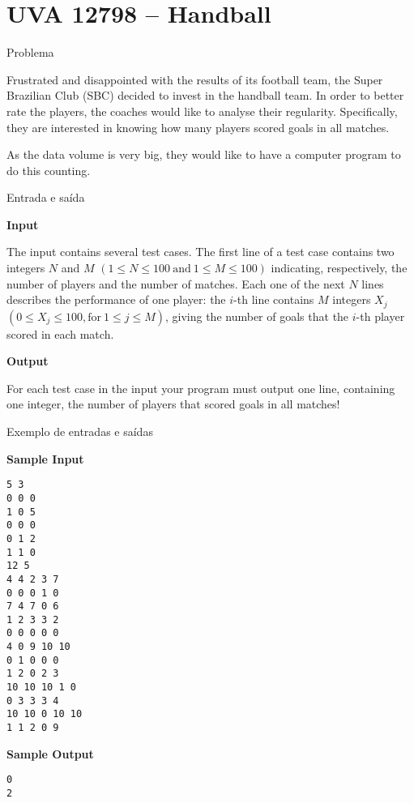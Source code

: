 \section{UVA 12798 -- Handball}

\begin{frame}[fragile]{Problema}

Frustrated and disappointed with the results of its football team, the Super Brazilian Club (SBC)
decided to invest in the handball team. In order to better rate the players, the coaches would like to
analyse their regularity. Specifically, they are interested in knowing how many players scored goals in
all matches.

As the data volume is very big, they would like to have a computer program to do this counting.

\end{frame}

\begin{frame}[fragile]{Entrada e saída}

\textbf{Input}

The input contains several test cases. The first line of a test case contains two integers $N$ and 
$M$ $(1\leq N\leq 100\ \mbox{and}\ 1\leq M\leq 100)$ indicating, respectively, the number of players and the number of matches. Each one of the next $N$ lines describes the performance of one player: 
the $i$-th line contains $M$ integers $X_j$ $(0\leq X_j\leq 100, \mbox{for}\ 1\leq j\leq M)$, 
giving the number of goals that the $i$-th player scored in each match.

\textbf{Output}

For each test case in the input your program must output one line, containing one integer, the number
of players that scored goals in all matches!

\end{frame}


\begin{frame}[fragile]{Exemplo de entradas e saídas}

\begin{footnotesize}
\begin{minipage}[t]{0.6\textwidth}
\textbf{Sample Input}
\begin{verbatim}
5 3
0 0 0
1 0 5
0 0 0
0 1 2
1 1 0
12 5
4 4 2 3 7
0 0 0 1 0
7 4 7 0 6
1 2 3 3 2
0 0 0 0 0
4 0 9 10 10
0 1 0 0 0
1 2 0 2 3
10 10 10 1 0
0 3 3 3 4
10 10 0 10 10
1 1 2 0 9
\end{verbatim}
\end{minipage}
\begin{minipage}[t]{0.35\textwidth}
\textbf{Sample Output}
\begin{verbatim}
0
2
\end{verbatim}
\end{minipage}
\end{footnotesize}

\end{frame}

